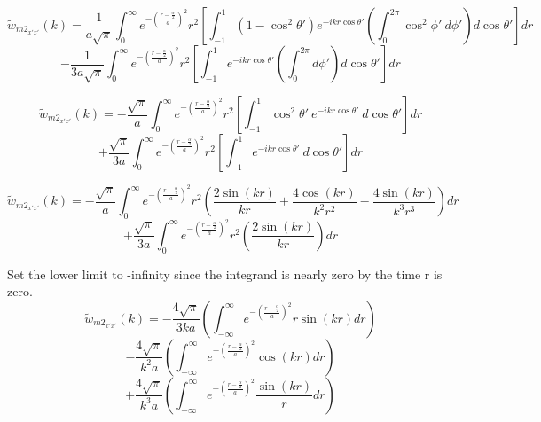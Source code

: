 \documentclass[double,12pt]{beavtex}
\begin{document}
\begin{displaymath}{\widetilde{w}_{{m2}_{x'x'}}(k)=\frac{1}{a\sqrt{\pi}}\int_{0}^{\infty}e^{-\left(\frac{r-\frac{\alpha}{2}}{a}\right)^2}r^2\left[\int_{-1}^{1}\left(1-\cos^2\theta'\right)e^{-ikr\cos\theta'}\left(\int_{0}^{2\pi}\cos^2\phi'~d{\phi'}\right)d{\cos\theta'}\right]d{r}}\end{displaymath} 
\begin{equation}{-\frac{1}{3a\sqrt{\pi}}\int_{0}^{\infty}e^{-\left(\frac{r-\frac{\alpha}{2}}{a}\right)^2}r^2\left[\int_{-1}^{1}e^{-ikr\cos\theta'}\left(\int_{0}^{2\pi}d{\phi'}\right)d{\cos\theta'}\right]d{r}}\end{equation}

\begin{displaymath}{\widetilde{w}_{{m2}_{x'x'}}(k)=-\frac{\sqrt{\pi}}{a}\int_{0}^{\infty}e^{-\left(\frac{r-\frac{\alpha}{2}}{a}\right)^2}r^2\left[\int_{-1}^{1}\cos^2\theta'~e^{-ikr\cos\theta'}~d{\cos\theta'}\right]d{r}}\end{displaymath} 
\begin{equation}\label{compare_equation}{+\frac{\sqrt{\pi}}{3a}\int_{0}^{\infty}e^{-\left(\frac{r-\frac{\alpha}{2}}{a}\right)^2}r^2\left[\int_{-1}^{1}e^{-ikr\cos\theta'}~d{\cos\theta'}\right]d{r}}\end{equation}

\begin{displaymath}{\widetilde{w}_{{m2}_{x'x'}}(k)=-\frac{\sqrt{\pi}}{a}\int_{0}^{\infty}e^{-\left(\frac{r-\frac{\alpha}{2}}{a}\right)^2}r^2\left(\frac{2\sin(kr)}{kr}+\frac{4\cos(kr)}{k^2r^2}-\frac{4\sin(kr)}{k^3r^3}\right)d{r}}\end{displaymath} 
\begin{equation}{+\frac{\sqrt{\pi}}{3a}\int_{0}^{\infty}e^{-\left(\frac{r-\frac{\alpha}{2}}{a}\right)^2}r^2\left(\frac{2\sin(kr)}{kr}\right)d{r}}\end{equation}

Set the lower limit to -infinity since the integrand is nearly zero by the time r is zero. 
\begin{displaymath}{\widetilde{w}_{{m2}_{x'x'}}(k)=-\frac{4\sqrt{\pi}}{3ka}\left(\int_{-\infty}^{\infty}e^{-\left(\frac{r-\frac{\alpha}{2}}{a}\right)^2}r\sin(kr)d{r}\right)}\end{displaymath} 
\begin{displaymath}{-\frac{4\sqrt{\pi}}{k^2a}\left(\int_{-\infty}^{\infty}e^{-\left(\frac{r-\frac{\alpha}{2}}{a}\right)^2}\cos(kr)d{r}\right)}\end{displaymath} 
\begin{equation}{+\frac{4\sqrt{\pi}}{k^3a}\left(\int_{-\infty}^{\infty}e^{-\left(\frac{r-\frac{\alpha}{2}}{a}\right)^2}\frac{\sin(kr)}{r}d{r}\right)}\end{equation} 
\end{document}
